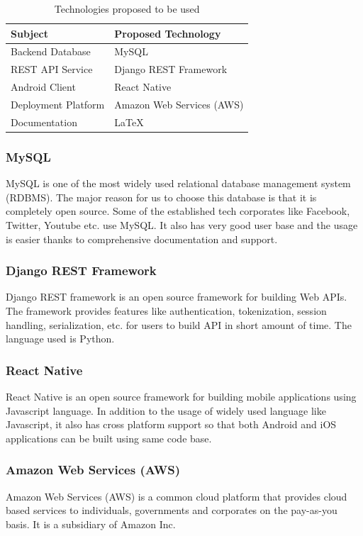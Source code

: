 \documentclass[12pt, a4paper, oneside]{article}
\begin{document}
\renewcommand{\arraystretch}{1.5}
\begin{table}[]
\begin{tabular}{|l|l|}
\hline
\rowcolor[HTML]{C0C0C0} 
\textbf{Subject}    & \textbf{Proposed Technology} \\ \hline
Backend Database            & MySQL                        \\ \hline
REST API Service    & Django REST Framework        \\ \hline
Android Client  & React Native                 \\ \hline
Deployment Platform & Amazon Web Services (AWS)    \\ \hline
Documentation & LaTeX \\ \hline
\end{tabular}
\caption{Technologies proposed to be used}
\label{table:tech}
\end{table}

\subsubsection{MySQL}
MySQL is one of the most widely used relational database management system (RDBMS). The major reason for us to choose this database is that it is completely open source. Some of the established tech corporates like Facebook, Twitter, Youtube etc. use MySQL. It also has very good user base and the usage is easier thanks to comprehensive documentation and support.

\subsubsection{Django REST Framework}
Django REST framework is an open source framework for building Web APIs. The framework provides features like authentication, tokenization, session handling, serialization, etc. for users to build API in short amount of time. The language used is Python.

\subsubsection{React Native}
React Native is an open source framework for building mobile applications using Javascript language. In addition to the usage of widely used language like Javascript, it also has cross platform support so that both Android and iOS applications can be built using same code base.

\subsubsection{Amazon Web Services (AWS)}
Amazon Web Services (AWS) is a common cloud platform that provides cloud based services to individuals, governments and corporates on the pay-as-you basis. It is a subsidiary of Amazon Inc.
\end{document}
